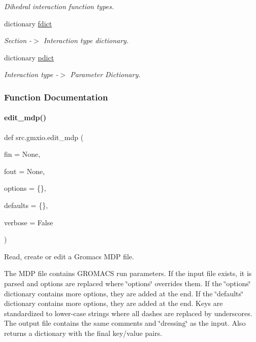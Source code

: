 \begin{DoxyCompactItemize}
\begin{DoxyCompactList}\small\item\em Dihedral interaction function types. \end{DoxyCompactList}\item 
dictionary \hyperlink{namespacesrc_1_1gmxio_afe3f61930bba41119de318d11a29dd14}{fdict}
\begin{DoxyCompactList}\small\item\em Section -\/$>$ Interaction type dictionary. \end{DoxyCompactList}\item 
dictionary \hyperlink{namespacesrc_1_1gmxio_ad55e036d51846e3440a373c57439dffa}{pdict}
\begin{DoxyCompactList}\small\item\em Interaction type -\/$>$ Parameter Dictionary. \end{DoxyCompactList}\end{DoxyCompactItemize}


\subsubsection{Function Documentation}
\mbox{\label{namespacesrc_1_1gmxio_aea51f8e8c67deaad0fccdb8bf633a69c}} 
\paragraph{\texorpdfstring{edit\+\_\+mdp()}{edit\_mdp()}}
{\footnotesize\ttfamily def src.\+gmxio.\+edit\+\_\+mdp (\begin{DoxyParamCaption}\item[{}]{fin = {\ttfamily None},  }\item[{}]{fout = {\ttfamily None},  }\item[{}]{options = {\ttfamily \{\}},  }\item[{}]{defaults = {\ttfamily \{\}},  }\item[{}]{verbose = {\ttfamily False} }\end{DoxyParamCaption})}



Read, create or edit a Gromacs M\+DP file. 

The M\+DP file contains G\+R\+O\+M\+A\+CS run parameters. If the input file exists, it is parsed and options are replaced where \char`\"{}options\char`\"{} overrides them. If the \char`\"{}options\char`\"{} dictionary contains more options, they are added at the end. If the \char`\"{}defaults\char`\"{} dictionary contains more options, they are added at the end. Keys are standardized to lower-\/case strings where all dashes are replaced by underscores. The output file contains the same comments and \char`\"{}dressing\char`\"{} as the input. Also returns a dictionary with the final key/value pairs.

